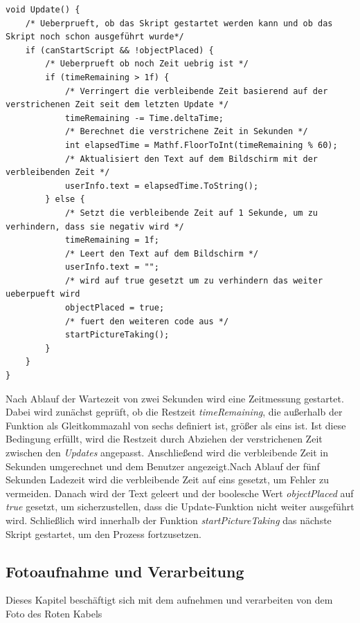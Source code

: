 \begin{lstlisting}[style=csharp, caption={Update des \textit{CableSearch} Skripts}, label=code:Timer]
void Update() {
    /* Ueberprueft, ob das Skript gestartet werden kann und ob das Skript noch schon ausgeführt wurde*/
    if (canStartScript && !objectPlaced) {
        /* Ueberprueft ob noch Zeit uebrig ist */
        if (timeRemaining > 1f) {
            /* Verringert die verbleibende Zeit basierend auf der verstrichenen Zeit seit dem letzten Update */
            timeRemaining -= Time.deltaTime;
            /* Berechnet die verstrichene Zeit in Sekunden */
            int elapsedTime = Mathf.FloorToInt(timeRemaining % 60);
            /* Aktualisiert den Text auf dem Bildschirm mit der verbleibenden Zeit */
            userInfo.text = elapsedTime.ToString();
        } else {
            /* Setzt die verbleibende Zeit auf 1 Sekunde, um zu verhindern, dass sie negativ wird */
            timeRemaining = 1f;
            /* Leert den Text auf dem Bildschirm */
            userInfo.text = "";
            /* wird auf true gesetzt um zu verhindern das weiter ueberpueft wird
            objectPlaced = true;
            /* fuert den weiteren code aus */
            startPictureTaking();
        }
    }
}
\end{lstlisting}
Nach Ablauf der Wartezeit von zwei Sekunden wird eine Zeitmessung gestartet. Dabei wird zunächst geprüft, ob die Restzeit \textit{timeRemaining}, die außerhalb der Funktion als Gleitkommazahl von sechs definiert ist, größer als eins ist. Ist diese Bedingung erfüllt, wird die Restzeit durch Abziehen der verstrichenen Zeit zwischen den \textit{Updates} angepasst. Anschließend wird die verbleibende Zeit in Sekunden umgerechnet und dem Benutzer angezeigt.Nach Ablauf der fünf Sekunden Ladezeit wird die verbleibende Zeit auf eins gesetzt, um Fehler zu vermeiden. Danach wird der Text geleert und der boolesche Wert \textit{objectPlaced} auf \textit{true} gesetzt, um sicherzustellen, dass die Update-Funktion nicht weiter ausgeführt wird. Schließlich wird innerhalb der Funktion \textit{startPictureTaking} das nächste Skript gestartet, um den Prozess fortzusetzen.

\subsection{Fotoaufnahme und Verarbeitung}
Dieses Kapitel beschäftigt sich mit dem aufnehmen und verarbeiten von dem Foto des Roten Kabels
